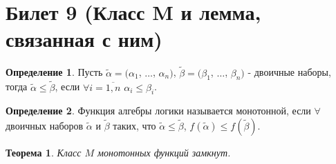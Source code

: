 \documentclass[a4paper, 12pt]{article}
\theoremstyle{definition}
\newtheorem*{definition}{Определение}
\theoremstyle{plain}
\newtheorem*{theorem}{Теорема}
\theoremstyle{remark}
\begin{document}
  \section{Билет 9 (Класс M и лемма, связанная с ним)}
  \begin{definition}
    Пусть $\tilde{\alpha}=(\alpha_1$, $\ldots$, $\alpha_n)$, $\tilde{\beta}=(\beta_1$, $\ldots$, $\beta_n)$ - двоичные наборы, тогда $\tilde{\alpha}\leqslant\tilde{\beta}$, если $\forall i=\overline{1,n}$ $\alpha_i\leqslant\beta_i$.
  \end{definition}
  \begin{definition}
    Функция алгебры логики называется монотонной, если $\forall$ двоичных наборов $\tilde{\alpha}$ и $\tilde{\beta}$ таких, что $\tilde{\alpha}\leqslant\tilde{\beta}$, $f(\tilde{\alpha})\leqslant f(\tilde{\beta})$.
  \end{definition}
  \begin{theorem}
    Класс $M$ монотонных функций замкнут.
  \end{theorem}
\end{document}
